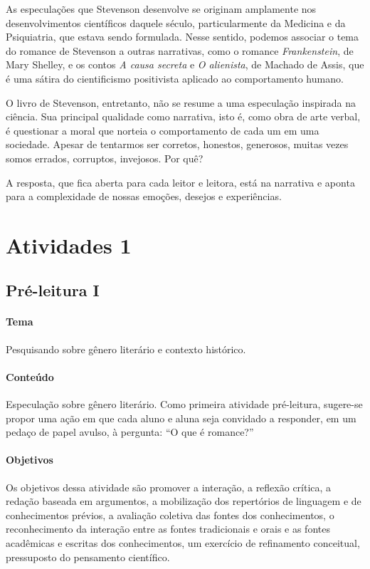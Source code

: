 \documentclass[12pt]{extarticle}
\begin{document}
As especulações que Stevenson desenvolve se originam amplamente nos
desenvolvimentos científicos daquele século, particularmente da Medicina
e da Psiquiatria, que estava sendo formulada. Nesse sentido, podemos
associar o tema do romance de Stevenson a outras narrativas, como o
romance \emph{Frankenstein}, de Mary Shelley, e os contos \emph{A causa
secreta} e \emph{O alienista}, de Machado de Assis, que é uma sátira do
cientificismo positivista aplicado ao comportamento humano.

O livro de Stevenson, entretanto, não se resume a uma especulação
inspirada na ciência. Sua principal qualidade como narrativa, isto é,
como obra de arte verbal, é questionar a moral que norteia o
comportamento de cada um em uma sociedade. Apesar de tentarmos ser
corretos, honestos, generosos, muitas vezes somos errados, corruptos,
invejosos. Por quê?

A resposta, que fica aberta para cada leitor e leitora, está na
narrativa e aponta para a complexidade de nossas emoções, desejos e
experiências.


\section{Atividades 1}

\subsection{Pré-leitura I}

\bnccativividadespreleitura
{}

\paragraph{Tema} Pesquisando sobre gênero literário e contexto histórico.



\paragraph{Conteúdo} Especulação sobre gênero literário.
Como primeira atividade pré-leitura, sugere-se propor uma ação em que
cada aluno e aluna seja convidado a responder, em um pedaço de papel
avulso, à pergunta: ``O que é romance?''

\paragraph{Objetivos}
Os objetivos dessa atividade são promover a interação, a reflexão
crítica, a redação baseada em argumentos, a mobilização dos repertórios
de linguagem e de conhecimentos prévios, a avaliação coletiva das fontes
dos conhecimentos, o reconhecimento da interação entre as fontes
tradicionais e orais e as fontes acadêmicas e escritas dos
conhecimentos, um exercício de refinamento conceitual, pressuposto do
pensamento científico.
\end{document}
